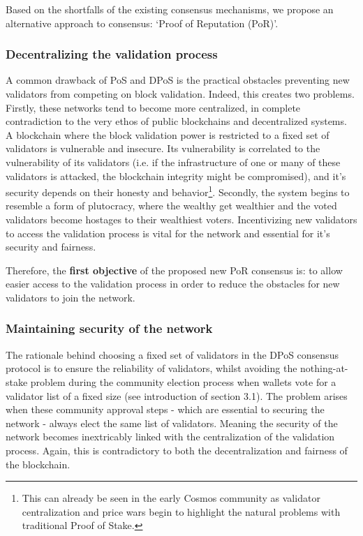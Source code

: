 Based on the shortfalls of the existing consensus mechanisms, we propose an alternative approach to consensus: ‘Proof of Reputation (PoR)'.	

\subsubsection{Decentralizing the validation process}  
\label{sec:kiblockchaindecentral}
A common drawback of PoS and DPoS is the practical obstacles preventing new validators from competing on block validation. Indeed, this creates two problems. Firstly, these networks tend to become more centralized, in complete contradiction to the very ethos of public blockchains and decentralized systems. A blockchain where the block validation power is restricted to a fixed set of validators is vulnerable and insecure. Its vulnerability is correlated to the vulnerability of its validators (i.e. if the infrastructure of one or many of these validators is attacked, the blockchain integrity might be compromised), and it's security depends on their honesty and behavior\footnote{This can already be seen in the early Cosmos community as validator centralization and price wars begin to highlight the natural problems with traditional Proof of Stake. }. Secondly, the system begins to resemble a form of plutocracy, where the wealthy get wealthier and the voted validators become hostages to their wealthiest voters. Incentivizing new validators to access the validation process is vital for the network and essential for it's security and fairness. 

Therefore, the \textbf{first objective} of the proposed new PoR consensus is: to allow easier access to the validation process in order to reduce the obstacles for new validators to join the network.

\subsubsection{Maintaining security of the network}
\label{sec:kiblockchaintradeoff}
The rationale behind choosing a fixed set of validators in the DPoS consensus protocol is to ensure the reliability of validators, whilst avoiding the nothing-at-stake problem during the community election process when wallets vote for a validator list of a fixed size (see introduction of section 3.1).  The problem arises when these community approval steps - which are essential to securing the network - always elect the same list of validators. Meaning the security of the network becomes inextricably linked with the centralization of the validation process. Again, this is contradictory to both the decentralization and fairness of the blockchain. 

